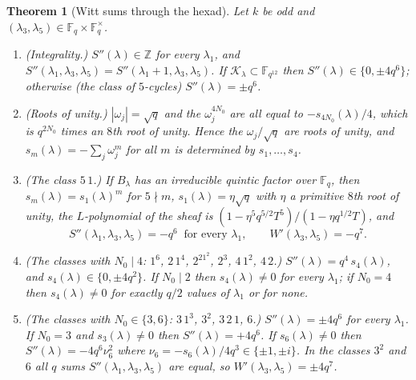 ﻿\documentclass[12pt,a4paper]{amsart}
\newtheorem{theorem}{Theorem}[section]
\theoremstyle{definition}
\newcommand{\F}{\mathbb{F}}
\newcommand{\Z}{\mathbb{Z}}
\newcommand{\Kk}{\mathcal{K}}
\newcommand{\Spp}{S''}
\begin{document}
\begin{theorem}[Witt sums through the hexad]\label{thm:witt}
Let $k$ be odd and $(\lambda_3,\lambda_5)\in\F_q\times\F_q^\times$.
\begin{enumerate}[label=\textup{(\alph*)},leftmargin=2em]
\item\textup{(Integrality.)} $\Spp(\lambda)\in\Z$ for every $\lambda_1$, and $\Spp(\lambda_1,\lambda_3,\lambda_5)=\Spp(\lambda_1+1,\lambda_3,\lambda_5)$. If $\Kk_\lambda\subset\F_{q^{12}}$ then $\Spp(\lambda)\in\{0,\pm4q^6\}$; otherwise (the class of $5$-cycles) $\Spp(\lambda)=\pm q^6$.
\item\textup{(Roots of unity.)} $|\omega_j|=\sqrt q$ and the $\omega_j^{4N_0}$ are all equal to $-s_{4N_0}(\lambda)/4$, which is $q^{2N_0}$ times an $8$th root of unity. Hence the $\omega_j/\sqrt q$ are roots of unity, and $s_m(\lambda)=-\sum_j\omega_j^m$ for all $m$ is determined by $s_1,\dots,s_4$.
\item\textup{(The class $5\,1$.)} If $B_\lambda$ has an irreducible quintic factor over $\F_q$, then $s_m(\lambda)=s_1(\lambda)^m$ for $5\nmid m$, $s_1(\lambda)=\eta\sqrt q$ with $\eta$ a primitive $8$th root of unity, the $L$-polynomial of the sheaf is $(1-\eta^5q^{5/2}T^5)/(1-\eta q^{1/2}T)$, and
\[
\Spp(\lambda_1,\lambda_3,\lambda_5)=-q^6\ \text{ for every }\lambda_1,\qquad W'(\lambda_3,\lambda_5)=-q^7 .
\]
\item\textup{(The classes with $N_0\mid4$: $1^6$, $2\,1^4$, $2^21^2$, $2^3$, $4\,1^2$, $4\,2$.)} $\Spp(\lambda)=q^4\,s_4(\lambda)$, and $s_4(\lambda)\in\{0,\pm4q^2\}$. If $N_0\mid2$ then $s_4(\lambda)\ne0$ for every $\lambda_1$; if $N_0=4$ then $s_4(\lambda)\ne0$ for exactly $q/2$ values of $\lambda_1$ or for none.
\item\textup{(The classes with $N_0\in\{3,6\}$: $3\,1^3$, $3^2$, $3\,2\,1$, $6$.)} $\Spp(\lambda)=\pm4q^6$ for every $\lambda_1$. If $N_0=3$ and $s_3(\lambda)\ne0$ then $\Spp(\lambda)=+4q^6$. If $s_6(\lambda)\ne0$ then $\Spp(\lambda)=-4q^6\nu_6^2$ where $\nu_6=-s_6(\lambda)/4q^3\in\{\pm1,\pm i\}$. In the classes $3^2$ and $6$ all $q$ sums $\Spp(\lambda_1,\lambda_3,\lambda_5)$ are equal, so $W'(\lambda_3,\lambda_5)=\pm4q^7$.
\end{enumerate}
\end{theorem}
\end{document}
